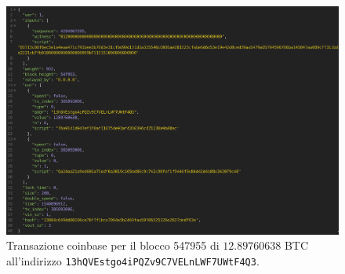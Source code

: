 \begin{figure}[H]
    \centering
    \includegraphics[width=\textwidth]{images/coinbasetx.png}
    \caption{Transazione coinbase per il blocco 547955 di $12.89760638$ BTC all'indirizzo \texttt{13hQVEstgo4iPQZv9C7VELnLWF7UWtF4Q3}.}
\end{figure}

